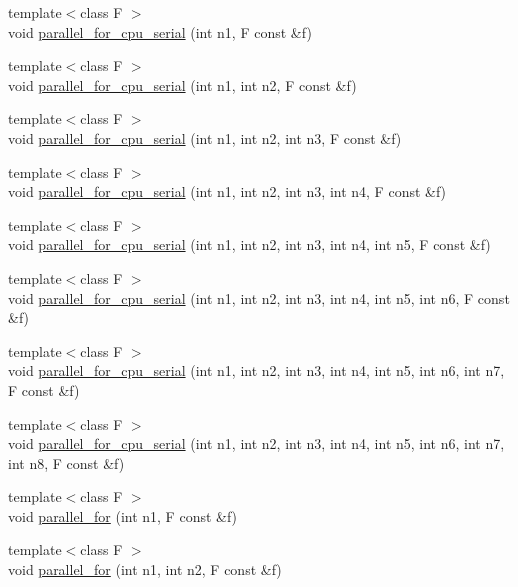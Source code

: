 \begin{DoxyCompactItemize}
\item 
{\footnotesize template$<$class F $>$ }\\void \hyperlink{namespaceyakl_abcbee87ad306ddf8ab2ee17caeae2e8b}{parallel\+\_\+for\+\_\+cpu\+\_\+serial} (int n1, F const \&f)
\item 
{\footnotesize template$<$class F $>$ }\\void \hyperlink{namespaceyakl_ad1f450cd63948c723accbf00e3ec3e3e}{parallel\+\_\+for\+\_\+cpu\+\_\+serial} (int n1, int n2, F const \&f)
\item 
{\footnotesize template$<$class F $>$ }\\void \hyperlink{namespaceyakl_a52c05cdadf373916fc16188650052ab2}{parallel\+\_\+for\+\_\+cpu\+\_\+serial} (int n1, int n2, int n3, F const \&f)
\item 
{\footnotesize template$<$class F $>$ }\\void \hyperlink{namespaceyakl_afb83cdb289bc069d1ffc218cd38e992b}{parallel\+\_\+for\+\_\+cpu\+\_\+serial} (int n1, int n2, int n3, int n4, F const \&f)
\item 
{\footnotesize template$<$class F $>$ }\\void \hyperlink{namespaceyakl_a668fe7b1f8e77dfd281e82ae9cad46ca}{parallel\+\_\+for\+\_\+cpu\+\_\+serial} (int n1, int n2, int n3, int n4, int n5, F const \&f)
\item 
{\footnotesize template$<$class F $>$ }\\void \hyperlink{namespaceyakl_a2e3777e8985e3fee7e10693611429bf7}{parallel\+\_\+for\+\_\+cpu\+\_\+serial} (int n1, int n2, int n3, int n4, int n5, int n6, F const \&f)
\item 
{\footnotesize template$<$class F $>$ }\\void \hyperlink{namespaceyakl_aa76038bc159013bfaed3a8eceac9590f}{parallel\+\_\+for\+\_\+cpu\+\_\+serial} (int n1, int n2, int n3, int n4, int n5, int n6, int n7, F const \&f)
\item 
{\footnotesize template$<$class F $>$ }\\void \hyperlink{namespaceyakl_a9e5308eeaac62f3347a095109c023360}{parallel\+\_\+for\+\_\+cpu\+\_\+serial} (int n1, int n2, int n3, int n4, int n5, int n6, int n7, int n8, F const \&f)
\item 
{\footnotesize template$<$class F $>$ }\\void \hyperlink{namespaceyakl_a37fd33412c5c3aedf957694af5e6f56b}{parallel\+\_\+for} (int n1, F const \&f)
\item 
{\footnotesize template$<$class F $>$ }\\void \hyperlink{namespaceyakl_a9e476f666e8754ca35761e178cc0da8f}{parallel\+\_\+for} (int n1, int n2, F const \&f)

\end{DoxyCompactItemize}
